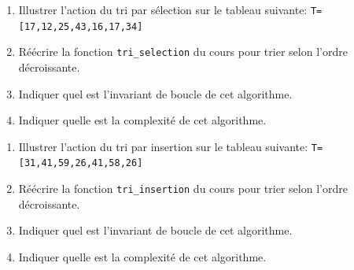 \documentclass[11pt, a4paper]{report}
\begin{document}
\def\level{Premiere}  %
\def\course{NSI}
\def\chaptername{Les tris} %
\def\docname{AP08~--~TD 1}        %

\pagestyle{DS_LP}

\NomPrenom{}

\begin{exercice_cours}{}

    \begin{enumerate}
        \item     Illustrer l'action du tri par sélection sur le tableau suivante: \verb|T=[17,12,25,43,16,17,34]|
        \item Réécrire la fonction \verb|tri_selection| du cours pour trier selon l'ordre décroissante.
        \item Indiquer quel est l'invariant de boucle de cet algorithme.
        \item Indiquer quelle est la complexité de cet algorithme.
    \end{enumerate}
\end{exercice_cours}

\begin{exercice_cours}{}

    \begin{enumerate}
        \item     Illustrer l'action du tri par insertion sur le tableau suivante: \verb|T=[31,41,59,26,41,58,26]|
        \item Réécrire la fonction \verb|tri_insertion| du cours pour trier selon l'ordre décroissante.
        \item Indiquer quel est l'invariant de boucle de cet algorithme.
        \item Indiquer quelle est la complexité de cet algorithme.
    \end{enumerate}
\end{exercice_cours}
\end{document}
